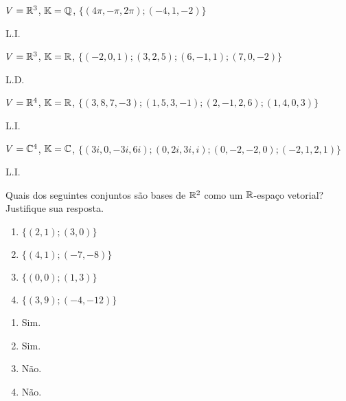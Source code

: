 \documentclass[12pt]{exam}
\begin{document}
    \begin{exercicio}
        $V = \mathbb{R}^3$, $\mathbb{K} = \mathbb{Q}$, $\{(4\pi, -\pi, 2\pi); (-4, 1, -2)\}$
        \begin{solucao}
            L.I.
        \end{solucao}
    \end{exercicio}

    \begin{exercicio}
        $V = \mathbb{R}^3$, $\mathbb{K} = \mathbb{R}$, $\{(-2, 0, 1); (3, 2, 5); (6, -1, 1); (7, 0, -2)\}$
        \begin{solucao}
            L.D.
        \end{solucao}
    \end{exercicio}

    \begin{exercicio}
        $V = \mathbb{R}^4$, $\mathbb{K} = \mathbb{R}$, $\{(3, 8, 7, -3); (1, 5, 3, -1); (2, -1, 2, 6); (1, 4, 0, 3)\}$
        \begin{solucao}
            L.I.
        \end{solucao}
    \end{exercicio}

    \begin{exercicio}\label{fimtesteldli}
        $V = \mathbb{C}^4$, $\mathbb{K} = \mathbb{C}$, $\{(3i, 0, -3i, 6i); (0, 2i, 3i, i); (0, -2, -2, 0); (-2, 1, 2, 1)\}$
        \begin{solucao}
            L.I.
        \end{solucao}
    \end{exercicio}

    \begin{exercicio}
        Quais dos seguintes conjuntos são bases de $\mathbb{R}^2$ como um $\mathbb{R}$-espaço vetorial? Justifique sua resposta.
        \begin{multicols}{2}
            \begin{enumerate}[label={\alph*})]
                \item $\{(2, 1); (3, 0)\}$
            
                \item $\{(4, 1); (-7, -8)\}$
            
                \item $\{(0, 0); (1, 3)\}$
            
                \item $\{(3, 9); (-4, -12)\}$
            \end{enumerate}
        \end{multicols}
        \begin{solucao}
            \begin{enumerate}[label={\alph*})]
                \item Sim.

                \item Sim.

                \item Não.

                \item Não.
            \end{enumerate}
        \end{solucao}
    \end{exercicio}
\end{document}
